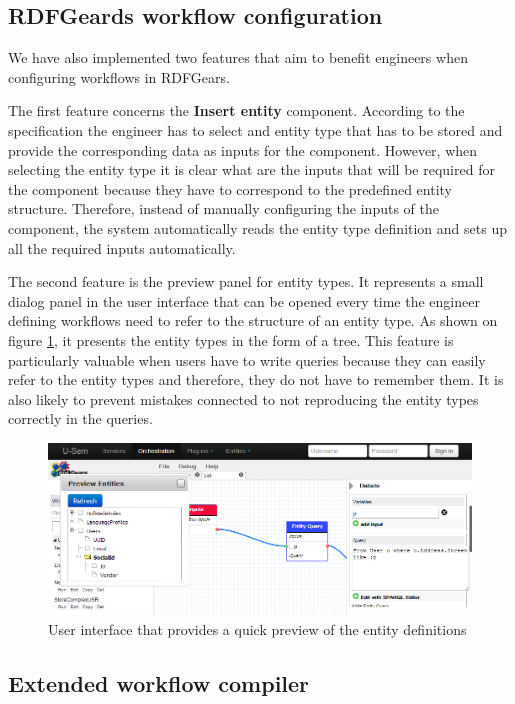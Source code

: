 \subsection{RDFGeards workflow configuration}
We have also implemented two features that aim to benefit engineers when configuring workflows in RDFGears.

The first feature concerns the \textbf{Insert entity} component. According to the specification the engineer has to select and entity type that has to be stored and provide the corresponding data as inputs for the component. However, when selecting the entity type it is clear what are the inputs that will be required for the component because they have to correspond to the predefined entity structure. Therefore, instead of manually configuring the inputs of the component, the system automatically reads the entity type definition and sets up all the required inputs automatically.

The second feature is the preview panel for entity types. It represents a small dialog panel in the user interface that can be opened every time the engineer defining workflows need to refer to the structure of an entity type. As shown on figure \ref{fig:storageEntityPreview}, it presents the entity types in the form of a tree. This feature is particularly valuable when users have to write queries because they can easily refer to the entity types and therefore, they do not have to remember them. It is also likely to prevent mistakes connected to not reproducing the entity types correctly in the queries.

\begin{figure}[h!]
  \centering
  	\includegraphics[scale=0.5]{storage/ui/entityPreview.png}
  \caption{User interface that provides a quick preview of the entity definitions}
  \label{fig:storageEntityPreview}
\end{figure}

\subsection{Extended workflow compiler}

